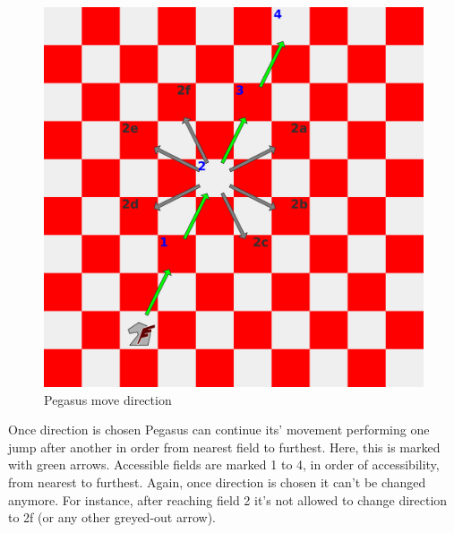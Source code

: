 \documentclass[a5paper,12pt,draft]{book} %
\begin{document}
\noindent
\begin{figure}[!t]
\includegraphics[width=1.0\textwidth, keepaspectratio=true]{../gfx/examples/02_move_pegasus_direction.png}
\caption{Pegasus move direction}
\label{fig:pegasus_move_direction}
\end{figure}
Once direction is chosen Pegasus can continue its' movement performing one jump
after another in order from nearest field to furthest. Here, this is marked
with green arrows. Accessible fields are marked 1 to 4, in order of accessibility,
from nearest to furthest. Again, once direction is chosen it can't be changed
anymore. For instance, after reaching field 2 it's not allowed to change
direction to 2f (or any other greyed-out arrow).

\clearpage
\end{document}
